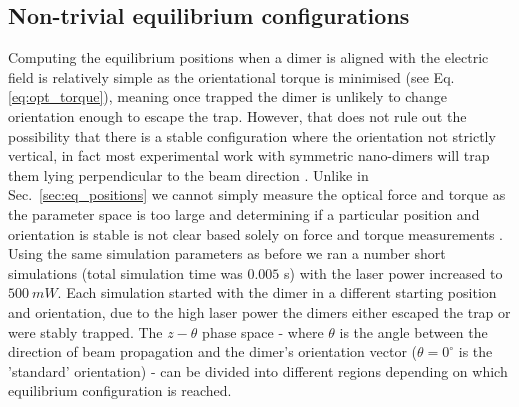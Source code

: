 \newpage
\subsection{Non-trivial equilibrium configurations}
\label{sec:off-axis}
Computing the equilibrium positions when a dimer is aligned with the electric 
field is relatively simple as the orientational torque is minimised (see
Eq.\ref{eq:opt_torque}), meaning once trapped the dimer is unlikely to change
orientation enough to escape the trap. However, that does not rule out the 
possibility that there is a stable configuration where the orientation not 
strictly vertical, in fact most experimental work with symmetric nano-dimers 
will trap them lying perpendicular to the beam direction \cite{Ahn2018, 
Reimann2018}. Unlike in Sec.~\ref{sec:eq_positions} we cannot simply measure 
the optical force and torque as the parameter space is too large and determining 
if a particular position and orientation is stable is not clear based solely 
on force and torque measurements \cite{Bui2017}. Using the same simulation 
parameters as before we ran a number short simulations (total simulation time 
was $0.005$ s) with the laser power increased to $500\ mW$. Each simulation 
started with the dimer in a different starting position and orientation, due 
to the high laser power the dimers either escaped the trap or were stably 
trapped. The $z-\theta$ phase space - where $\theta$ is the angle between the 
direction of beam propagation and the dimer's orientation vector ($\theta=0^
\circ$ is the 'standard' orientation) - can be divided into different regions 
depending on which equilibrium configuration is reached.

